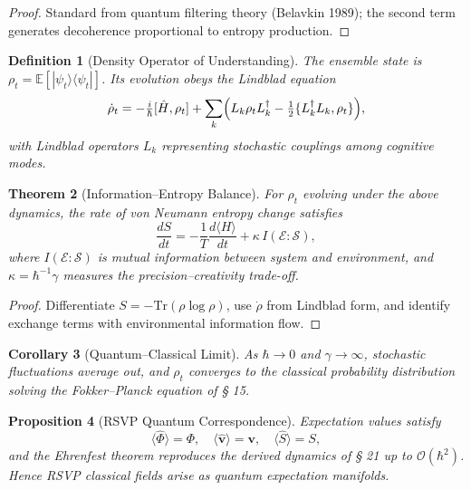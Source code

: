 \documentclass[12pt,a4paper,twoside,openright]{book}
\newtheorem{theorem}{Theorem}
\newtheorem{proposition}[theorem]{Proposition}
\newtheorem{definition}[theorem]{Definition}
\newtheorem{corollary}[theorem]{Corollary}
\begin{document}
\begin{proof}
Standard from quantum filtering theory (Belavkin 1989);  
the second term generates decoherence proportional to entropy production.
\end{proof}

\begin{definition}[Density Operator of Understanding]
The ensemble state is $\rho_t=\mathbb{E}[|\psi_t\rangle\!\langle\psi_t|]$.  
Its evolution obeys the Lindblad equation
\[
\dot{\rho}_t
 = -\tfrac{i}{\hbar}[\hat{H},\rho_t]
   +\sum_k
      \Bigl(
         L_k\rho_t L_k^\dagger
       - \tfrac{1}{2}\{L_k^\dagger L_k,\rho_t\}
      \Bigr),
\]
with Lindblad operators $L_k$ representing stochastic couplings among cognitive modes.
\end{definition}

\begin{theorem}[Information–Entropy Balance]
\label{thm:infentropy}
For $\rho_t$ evolving under the above dynamics,  
the rate of von Neumann entropy change satisfies
\[
\frac{dS}{dt}
 = -\frac{1}{T}\frac{d\langle H\rangle}{dt}
   + \kappa\,I(\mathcal{E}\!:\!\mathcal{S}),
\]
where $I(\mathcal{E}\!:\!\mathcal{S})$ is mutual information between system and environment,  
and $\kappa=\hbar^{-1}\gamma$ measures the precision–creativity trade-off.
\end{theorem}

\begin{proof}
Differentiate $S=-\mathrm{Tr}(\rho\log\rho)$, use $\dot{\rho}$ from Lindblad form, and identify exchange terms with environmental information flow.
\end{proof}

\begin{corollary}[Quantum–Classical Limit]
As $\hbar\!\to\!0$ and $\gamma\!\to\!\infty$,  
stochastic fluctuations average out, and $\rho_t$ converges to the classical probability distribution solving the Fokker–Planck equation of § 15.
\end{corollary}

\begin{proposition}[RSVP Quantum Correspondence]
Expectation values satisfy
\[
\langle \hat{\Phi} \rangle = \Phi,\quad
\langle \hat{\mathbf{v}} \rangle = \mathbf{v},\quad
\langle \hat{S} \rangle = S,
\]
and the Ehrenfest theorem reproduces the derived dynamics of § 21 up to $\mathcal{O}(\hbar^2)$.
Hence RSVP classical fields arise as quantum expectation manifolds.
\end{proposition}
\end{document}
